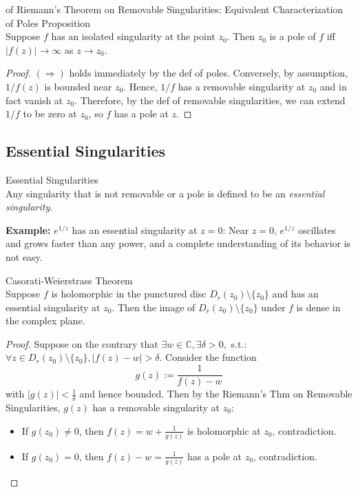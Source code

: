 \begin{corollary}{of Riemann's Theorem on Removable Singularities: Equivalent Characterization of Poles Proposition}\\
Suppose $f$ has an isolated singularity at the point $z_0$. Then $z_0$ is a pole of $f$ iff $|f(z)| \to \infty$ as $z\to z_0$.
\end{corollary}

\begin{proof}
    $(\Rightarrow)$ holds immediately by the def of poles. Conversely, by assumption, $1/f(z)$ is bounded near $z_0$. Hence, $1/f$ has a removable singularity at $z_0$ and in fact vanish at $z_0$. Therefore, by the def of removable singularities, we can extend $1/f$ to be zero at $z_0$, so $f$ has a pole at $z$.
\end{proof}

\subsection{Essential Singularities}

\begin{definition}{Essential Singularities}\\
Any singularity that is not removable or a pole is defined to be an \textit{essential singularity}.
\end{definition}

\noindent\textbf{Example:} $e^{1/z}$ has an essential singularity at $z=0$: Near $z=0$, $e^{1/z}$ oscillates and grows faster than any power, and a complete understanding of its behavior is not easy.

\begin{theorem}{Casorati-Weierstrass Theorem}\\
Suppose $f$ is holomorphic in the punctured disc $D_r(z_0) \setminus \{z_0\}$ and has an essential singularity at $z_0$. Then the image of $D_r(z_0) \setminus \{z_0\}$ under $f$ is dense in the complex plane.
\end{theorem}

\begin{proof}
    Suppose on the contrary that $\exists w\in \mathbb{C}, \exists \delta>0,$ s.t.: $\forall z\in D_r(z_0) \setminus \{z_0\}, |f(z)-w|>\delta$. Consider the function
    \[
    g(z):= \frac{1}{f(z)-w}
    \]
    with $|g(z)|< \frac{1}{\delta}$ and hence bounded. Then by the Riemann's Thm on Removable Singularities, $g(z)$ has a removable singularity at $z_0$:
    \begin{itemize}
        \item If $g(z_0) \neq 0$, then $f(z)= w+\frac{1}{g(z)}$ is holomorphic at $z_0$, contradiction.
        \item If $g(z_0)=0$, then $f(z)-w= \frac{1}{g(z)}$ has a pole at $z_0$, contradiction.
    \end{itemize}
\end{proof}

